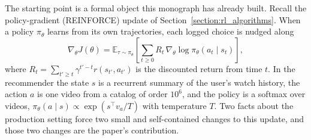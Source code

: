 The starting point is a formal object this monograph has already built. Recall the policy-gradient (REINFORCE) update of Section~\ref{section:rl_algorithms}. When a policy $\pi_\theta$ learns from its own trajectories, each logged choice is nudged along
\begin{equation}
\label{eq:yt_reinforce}
\nabla_\theta J(\theta) = \mathbb{E}_{\tau \sim \pi_\theta}\!\left[\sum_{t \geq 0} R_t\, \nabla_\theta \log \pi_\theta(a_t \mid s_t)\right],
\end{equation}
where $R_t = \sum_{t' \geq t} \gamma^{t'-t} r(s_{t'}, a_{t'})$ is the discounted return from time $t$. In the recommender the state $s$ is a recurrent summary of the user's watch history, the action $a$ is one video from a catalog of order $10^6$, and the policy is a softmax over videos, $\pi_\theta(a \mid s) \propto \exp(s^\top v_a / T)$ with temperature $T$. Two facts about the production setting force two small and self-contained changes to this update, and those two changes are the paper's contribution.

